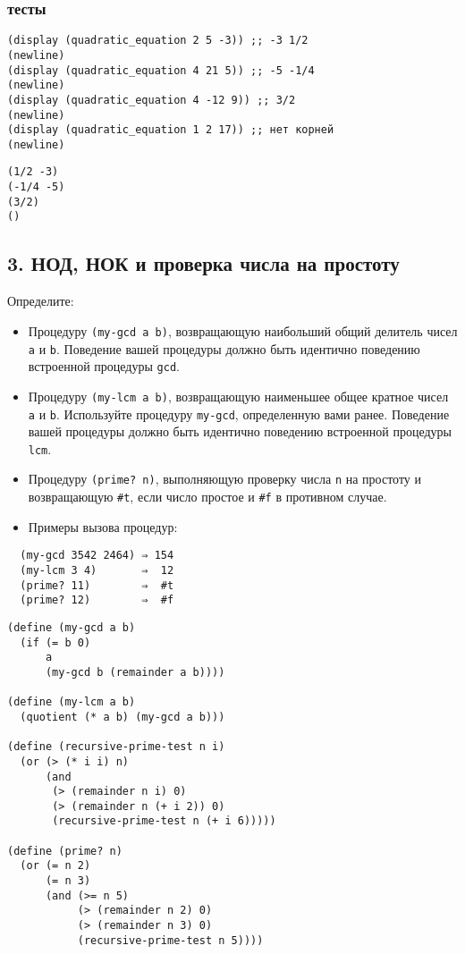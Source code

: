 \documentclass[11pt]{article}
\begin{document}
\subsubsection{тесты}
\label{sec:org23ebae3}
\begin{verbatim}
(display (quadratic_equation 2 5 -3)) ;; -3 1/2
(newline)
(display (quadratic_equation 4 21 5)) ;; -5 -1/4
(newline)
(display (quadratic_equation 4 -12 9)) ;; 3/2
(newline)
(display (quadratic_equation 1 2 17)) ;; нет корней
(newline)
\end{verbatim}

\begin{verbatim}
(1/2 -3)
(-1/4 -5)
(3/2)
()
\end{verbatim}

\subsection{3. НОД, НОК и проверка числа на простоту}
\label{нод-нок-и-проверка-числа-на-простоту}
Определите:

\begin{itemize}
\item Процедуру \texttt{(my-gcd a b)}, возвращающую наибольший общий делитель чисел
\texttt{a} и \texttt{b}. Поведение вашей процедуры должно быть идентично поведению
встроенной процедуры \texttt{gcd}.

\item Процедуру \texttt{(my-lcm a b)}, возвращающую наименьшее общее кратное чисел
\texttt{a} и \texttt{b}. Используйте процедуру \texttt{my-gcd}, определенную вами ранее.
Поведение вашей процедуры должно быть идентично поведению встроенной
процедуры \texttt{lcm}.

\item Процедуру \texttt{(prime? n)}, выполняющую проверку числа \texttt{n} на простоту и
возвращающую \texttt{\#t}, если число простое и \texttt{\#f} в противном случае.

\item Примеры вызова процедур:
\end{itemize}

\begin{verbatim}
  (my-gcd 3542 2464) ⇒ 154
  (my-lcm 3 4)       ⇒  12
  (prime? 11)        ⇒  #t
  (prime? 12)        ⇒  #f
\end{verbatim}
\begin{verbatim}
(define (my-gcd a b)
  (if (= b 0)
      a
      (my-gcd b (remainder a b))))

(define (my-lcm a b)
  (quotient (* a b) (my-gcd a b)))

(define (recursive-prime-test n i)
  (or (> (* i i) n)
      (and
       (> (remainder n i) 0)
       (> (remainder n (+ i 2)) 0)
       (recursive-prime-test n (+ i 6)))))

(define (prime? n)
  (or (= n 2)
      (= n 3)
      (and (>= n 5)
           (> (remainder n 2) 0)
           (> (remainder n 3) 0)
           (recursive-prime-test n 5))))
\end{verbatim}
\end{document}
